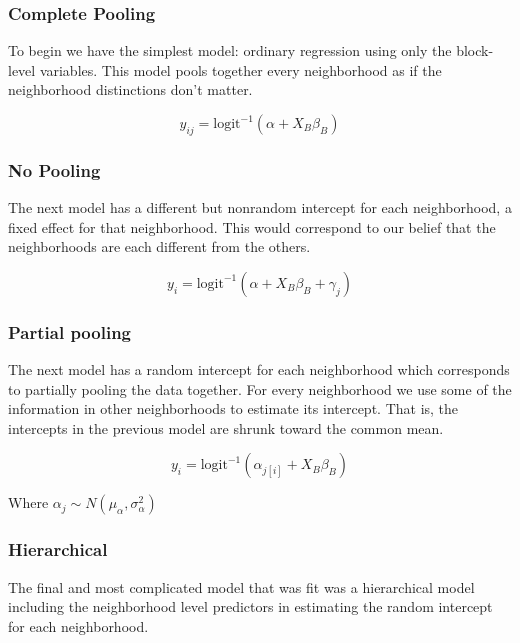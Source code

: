 \documentclass{report}
\begin{document}
\subsubsection*{Complete Pooling}

To begin we have the simplest model: ordinary regression using only the block-level variables. This model pools together every neighborhood as if the neighborhood distinctions don't matter. 

$$ y_{ij} = \text{logit}^{-1}\left( \alpha + X_{B}\beta_{B}  \right) $$


\subsubsection*{No Pooling}

The next model has a different but nonrandom intercept for each neighborhood, a fixed effect for that neighborhood. This would correspond to our belief that the neighborhoods are each different from the others. 

$$ y_{i} = \text{logit}^{-1}\left( \alpha + X_{B}\beta_{B} +  \gamma_j  \right) $$


\subsubsection*{Partial pooling}

The next model has a random intercept for each neighborhood which corresponds to partially pooling the data together. For every neighborhood we use some of the information in other neighborhoods to estimate its intercept. That is, the intercepts in the previous model are shrunk toward the common mean. 

$$ y_{i} = \text{logit}^{-1}\left( \alpha_{j[i]} + X_{B}\beta_{B}  \right) $$

Where %
$\alpha_j \sim N(\mu_\alpha, \sigma^2_\alpha)$

\subsubsection*{Hierarchical}

The final and most complicated model that was fit was a hierarchical model including the neighborhood level predictors in estimating the random intercept for each neighborhood. 
\end{document}
